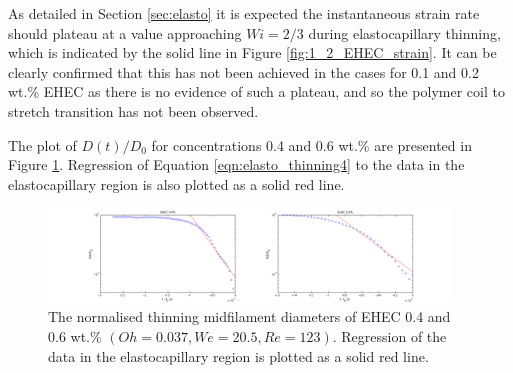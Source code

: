 \documentclass[11pt]{article}
\begin{document}
As detailed in Section \ref{sec:elasto} it is expected the instantaneous strain 
rate should plateau at a value approaching $Wi = 2/3$ during elastocapillary 
thinning, which is indicated by the solid line in Figure 
\ref{fig:1_2_EHEC_strain}. It can be clearly confirmed that this has not been 
achieved in the cases for 0.1 and 0.2 wt.\% EHEC as there is no evidence of 
such a plateau, and so the polymer coil to stretch transition has not been 
observed.

The plot of $D(t)/D_0$ for concentrations 0.4 and 0.6 wt.\% are presented in 
Figure \ref{fig:4_6_EHEC}. Regression of Equation \ref{eqn:elasto_thinning4} to 
the data in the elastocapillary region is also plotted as a solid red line.
\begin{figure}[H]
	\begin{center}
		\includegraphics[width=0.95\textwidth, trim = 7cm 0cm 6cm 0cm]{img/4_6_EHEC.png}
		\caption{The normalised thinning midfilament diameters of EHEC 0.4 and 
0.6 wt.\% $ \left(Oh = 0.037 , We = 20.5, Re = 123 \right)$. Regression of the 
data in the elastocapillary region is plotted as a solid red line.}
		\label{fig:4_6_EHEC}
	\end{center}
\end{figure}
\end{document}
